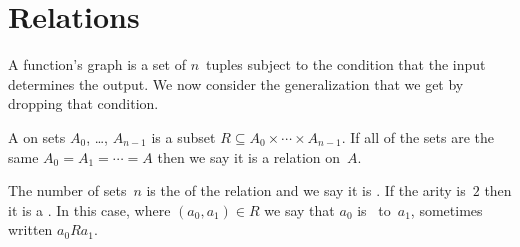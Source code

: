\documentclass{ibl}  %
\begin{document}
\begin{problem}

\end{problem}





\section{Relations}
A function's graph is a set of $n$~tuples
subject to the condition that the input determines the output.
We now consider the generalization that we get by dropping that condition.  

\begin{df}
A  on sets $A_0$, \ldots, $A_{n-1}$ is a subset
$R\subseteq A_0\times \cdots \times A_{n-1}$. 
If all of the sets are the same $A_0=A_1=\cdots =A$
then we say it is a relation on~$A$.

The number of sets~$n$ is the  of the relation
and we say it is .
If the arity is~$2$ then it is a .
In this case, where $(a_0,a_1)\in R$ we say 
that $a_0$ is~ to~$a_1$,
sometimes written $a_0Ra_1$.
\end{df}
\end{document}
